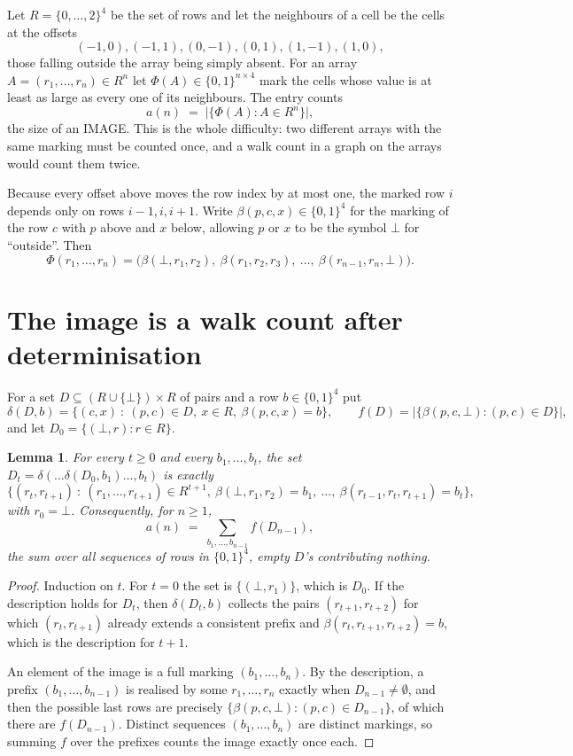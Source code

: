 \documentclass[11pt,a4paper]{article}
\theoremstyle{plain}
\newtheorem{lemma}[theorem]{Lemma}
\theoremstyle{definition}
\begin{document}
Let $R=\{0,\dots,2\}^{4}$ be the set of rows and let the neighbours of a cell be the
cells at the offsets
\[
(-1,0), (-1,1), (0,-1), (0,1), (1,-1), (1,0),
\]
those falling outside the array being simply absent. For an array
$A=(r_1,\dots,r_n)\in R^n$ let $\Phi(A)\in\{0,1\}^{n\times4}$ mark the cells whose value
is at least as large as every one of its neighbours. The entry counts
\[
a(n)\;=\;\bigl|\{\Phi(A):A\in R^n\}\bigr| ,
\]
the size of an IMAGE. This is the whole difficulty: two different arrays with the same marking
must be counted once, and a walk count in a graph on the arrays would count them twice.

Because every offset above moves the row index by at most one, the marked row $i$ depends only
on rows $i-1,i,i+1$. Write $\beta(p,c,x)\in\{0,1\}^{4}$ for the marking of the row $c$
with $p$ above and $x$ below, allowing $p$ or $x$ to be the symbol $\bot$ for ``outside''.
Then
\[
\Phi(r_1,\dots,r_n)=\bigl(\beta(\bot,r_1,r_2),\ \beta(r_1,r_2,r_3),\ \dots,\
\beta(r_{n-1},r_n,\bot)\bigr).
\]

\section{The image is a walk count after determinisation}

For a set $D\subseteq(R\cup\{\bot\})\times R$ of pairs and a row $b\in\{0,1\}^{4}$ put
\[
\delta(D,b)=\{(c,x)\ :\ (p,c)\in D,\ x\in R,\ \beta(p,c,x)=b\},\qquad
f(D)=\bigl|\{\beta(p,c,\bot):(p,c)\in D\}\bigr| ,
\]
and let $D_0=\{(\bot,r):r\in R\}$.

\begin{lemma}\label{lem:det}
For every $t\ge0$ and every $b_1,\dots,b_t$, the set
$D_t=\delta(\dots\delta(D_0,b_1)\dots,b_t)$ is exactly
\[
\{(r_t,r_{t+1})\ :\ (r_1,\dots,r_{t+1})\in R^{t+1},\ \beta(\bot,r_1,r_2)=b_1,\ \dots,\
\beta(r_{t-1},r_t,r_{t+1})=b_t\} ,
\]
with $r_0=\bot$. Consequently, for $n\ge1$,
\[
a(n)\;=\;\sum_{b_1,\dots,b_{n-1}}f(D_{n-1}),
\]
the sum over all sequences of rows in $\{0,1\}^{4}$, empty $D$'s contributing nothing.
\end{lemma}

\begin{proof}
Induction on $t$. For $t=0$ the set is $\{(\bot,r_1)\}$, which is $D_0$. If the description
holds for $D_t$, then $\delta(D_t,b)$ collects the pairs $(r_{t+1},r_{t+2})$ for which
$(r_t,r_{t+1})$ already extends a consistent prefix and
$\beta(r_t,r_{t+1},r_{t+2})=b$, which is the description for $t+1$.

An element of the image is a full marking $(b_1,\dots,b_n)$. By the description, a prefix
$(b_1,\dots,b_{n-1})$ is realised by some $r_1,\dots,r_n$ exactly when $D_{n-1}\neq
\emptyset$, and then the possible last rows are precisely
$\{\beta(p,c,\bot):(p,c)\in D_{n-1}\}$, of which there are $f(D_{n-1})$. Distinct
sequences $(b_1,\dots,b_n)$ are distinct markings, so summing $f$ over the prefixes counts the
image exactly once each.
\end{proof}
\end{document}
